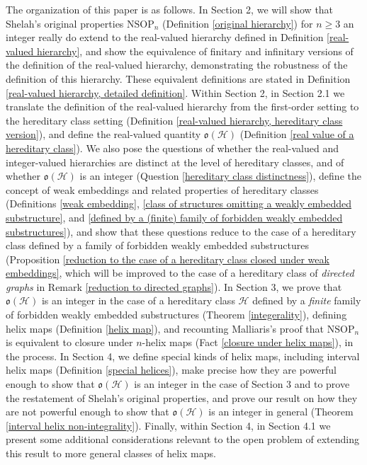 \documentclass{amsart}
\theoremstyle{definition}
\theoremstyle{remark}
\numberwithin{equation}{section}
\begin{document}
The organization of this paper is as follows. In Section 2, we will show that Shelah's original properties $\mathrm{NSOP}_{n}$ (Definition \ref{original hierarchy}) for $n \geq 3$ an integer really do extend to the real-valued hierarchy defined in Definition \ref{real-valued hierarchy}, and show the equivalence of finitary and infinitary versions of the definition of the real-valued hierarchy, demonstrating the robustness of the definition of this hierarchy. These equivalent definitions are stated in Definition \ref{real-valued hierarchy, detailed definition}. Within Section 2, in Section 2.1 we translate the definition of the real-valued hierarchy from the first-order setting to the hereditary class setting (Definition \ref{real-valued hierarchy, hereditary class version}), and define the real-valued quantity $\mathfrak{o}(\mathcal{H})$ (Definition \ref{real value of a hereditary class}). We also pose the questions of whether the real-valued and integer-valued hierarchies are distinct at the level of hereditary classes, and of whether $\mathfrak{o}(\mathcal{H})$ is an integer (Question \ref{hereditary class distinctness}), define the concept of weak embeddings and related properties of hereditary classes (Definitions \ref{weak embedding}, \ref{class of structures omitting a weakly embedded substructure}, and \ref{defined by a (finite) family of forbidden weakly embedded substructures}), and show that these questions reduce to the case of a hereditary class defined by a family of forbidden weakly embedded substructures (Proposition \ref{reduction to the case of a hereditary class closed under weak embeddings}, which will be improved to the case of a hereditary class of \textit{directed graphs} in Remark \ref{reduction to directed graphs}). In Section 3, we prove that $\mathfrak{o}(\mathcal{H})$ is an integer in the case of a hereditary class $\mathcal{H}$ defined by a \textit{finite} family of forbidden weakly embedded substructures (Theorem \ref{integerality}), defining helix maps (Definition \ref{helix map}), and recounting Malliaris's proof that $\mathrm{NSOP}_{n}$ is equivalent to closure under $n$-helix maps (Fact \ref{closure under helix maps}), in the process. In Section 4, we define special kinds of helix maps, including interval helix maps (Definition \ref{special helices}), make precise how they are powerful enough to show that $\mathfrak{o}(\mathcal{H})$ is an integer in the case of Section 3 and to prove the restatement of Shelah's original properties, and prove our result on how they are not powerful enough to show that $\mathfrak{o}(\mathcal{H})$ is an integer in general (Theorem \ref{interval helix non-integrality}). Finally, within Section 4, in Section 4.1 we present some additional considerations relevant to the open problem of extending this result to more general classes of helix maps.
\end{document}

